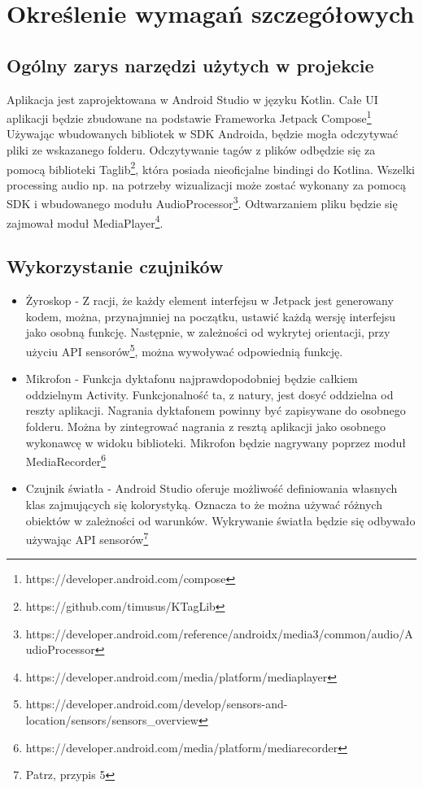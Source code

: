 \newpage
\section{Określenie wymagań szczegółowych}		%

\subsection{Ogólny zarys narzędzi użytych w projekcie}

Aplikacja jest zaprojektowana w Android Studio w języku Kotlin. Całe UI aplikacji będzie zbudowane na podstawie Frameworka Jetpack Compose\footnote{https://developer.android.com/compose} Używając wbudowanych bibliotek w SDK Androida, będzie mogła odczytywać pliki ze wskazanego folderu. Odczytywanie tagów z plików odbędzie się za pomocą biblioteki Taglib\footnote{https://github.com/timusus/KTagLib}, która posiada nieoficjalne bindingi do Kotlina. Wszelki processing audio np. na potrzeby wizualizacji może zostać wykonany za pomocą SDK i wbudowanego modułu AudioProcessor\footnote{https://developer.android.com/reference/androidx/media3/common/audio/AudioProcessor}. Odtwarzaniem pliku będzie się zajmował moduł MediaPlayer\footnote{https://developer.android.com/media/platform/mediaplayer}.

\subsection{Wykorzystanie czujników}

\begin{itemize}
	\item Żyroskop - Z racji, że każdy element interfejsu w Jetpack jest generowany kodem, można, przynajmniej na początku, ustawić każdą wersję interfejsu jako osobną funkcję. Następnie, w zależności od wykrytej orientacji, przy użyciu API sensorów\footnote{https://developer.android.com/develop/sensors-and-location/sensors/sensors\_overview}, można wywoływać odpowiednią funkcję.
	
	\item Mikrofon - Funkcja dyktafonu najprawdopodobniej będzie całkiem oddzielnym Activity. Funkcjonalność ta, z natury, jest dosyć oddzielna od reszty aplikacji. Nagrania dyktafonem powinny być zapisywane do osobnego folderu. Można by zintegrować nagrania z resztą aplikacji jako osobnego wykonawcę w widoku biblioteki. Mikrofon będzie nagrywany poprzez moduł MediaRecorder\footnote{https://developer.android.com/media/platform/mediarecorder}

	\item Czujnik światła - Android Studio oferuje możliwość definiowania własnych klas zajmujących się kolorystyką. Oznacza to że można używać różnych obiektów w zależności od warunków. Wykrywanie światła będzie się odbywało używając API sensorów\footnote{Patrz, przypis 5} %
\end{itemize}

